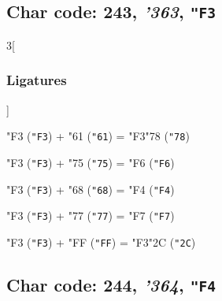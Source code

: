 \documentclass{article}
\newlength{\maxcharwidth}
\begin{document}
\subsection{Char code: 243, {\it'363}, {\tt"F3}}
\label{char_243}


\begin{multicols}{3}[\subsubsection{Ligatures}]

{\testfont\char"F3\noboundary} ({\tt"F3}) + {\testfont\char"61\noboundary} ({\tt"61}) = {\testfont\char"F3\noboundary}{\testfont\char"78\noboundary} ({\tt"78}) 

{\testfont\char"F3\noboundary} ({\tt"F3}) + {\testfont\char"75\noboundary} ({\tt"75}) = {\testfont\char"F6\noboundary} ({\tt"F6}) 

{\testfont\char"F3\noboundary} ({\tt"F3}) + {\testfont\char"68\noboundary} ({\tt"68}) = {\testfont\char"F4\noboundary} ({\tt"F4}) 

{\testfont\char"F3\noboundary} ({\tt"F3}) + {\testfont\char"77\noboundary} ({\tt"77}) = {\testfont\char"F7\noboundary} ({\tt"F7}) 

{\testfont\char"F3\noboundary} ({\tt"F3}) + {\testfont\char"FF\noboundary} ({\tt"FF}) = {\testfont\char"F3\noboundary}{\testfont\char"2C\noboundary} ({\tt"2C}) 

\end{multicols}

\subsection{Char code: 244, {\it'364}, {\tt"F4}}
\label{char_244}

\end{document}
